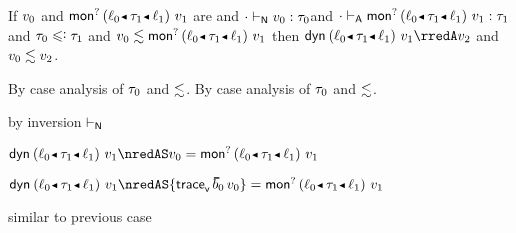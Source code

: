 \begin{lemma}\label{HA-S-compat-1}
  If\/ $v_0$ and\/ ${\emopt{\obnd{\sowner_0}{\stype_1}{\sowner_1}}{\svalue_1}}$ are \reducedsurfaceexpressions{}
  and\/ ${\cdot} \vdash_{\mathsf{N}} v_0 : \tau_0\!\!$
  and\/ $\snil \sWTA {\emopt{\obnd{\sowner_0}{\stype_1}{\sowner_1}}{\svalue_1}} : \stype_1$
  and\/ $\stype_0 \subteq \stype_1$
  and\/ $\rexpr{\svalue_0}{\emopt{\obnd{\sowner_0}{\stype_1}{\sowner_1}}{\svalue_1}}$
  then\/ $\edynb{\obnd{\sowner_0}{\stype_1}{\sowner_1}}{\svalue_1} \rredA \svalue_2$
  and\/ $v_0 \lesssim v_2$.
\end{lemma}{
  \newcommand{\shortpf}{By case analysis of $\stype_0$ and $\srexpr$.}
\begin{lamportproof*}
  \shortpf
\mainproof
  \shortpf

    \begin{pfproof}
        \begin{pfproof}
          by inversion $\vdash_{\mathsf{N}}$
        \end{pfproof}
        \begin{pfproof}
          \qedstep
            \begin{pfproof}
              $\edynb{\obnd{\sowner_0}{\stype_1}{\sowner_1}}{\svalue_1} \nredAS \svalue_0 \feq \emopt{\obnd{\sowner_0}{\stype_1}{\sowner_1}}{\svalue_1}$
            \end{pfproof}
        \end{pfproof}
        \begin{pfproof}
          \qedstep
            \begin{pfproof}
              $\edynb{\obnd{\sowner_0}{\stype_1}{\sowner_1}}{\svalue_1} \nredAS {\ehist{\sblist_0}{\svalue_0}} \feq \emopt{\obnd{\sowner_0}{\stype_1}{\sowner_1}}{\svalue_1}$
            \end{pfproof}
        \end{pfproof}
    \end{pfproof}

    \begin{pfproof}
      similar to previous case
    \end{pfproof}


\end{lamportproof*}}

